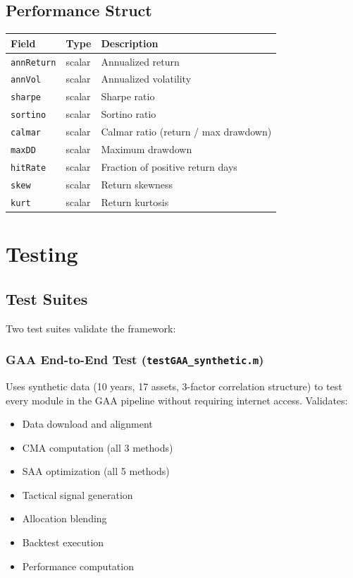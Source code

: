 \documentclass[11pt,a4paper]{article}
\begin{document}
\subsection{Performance Struct}
\begin{center}
\begin{tabularx}{\textwidth}{l l X}
\toprule
\textbf{Field} & \textbf{Type} & \textbf{Description} \\
\midrule
\texttt{annReturn} & scalar & Annualized return \\
\texttt{annVol} & scalar & Annualized volatility \\
\texttt{sharpe} & scalar & Sharpe ratio \\
\texttt{sortino} & scalar & Sortino ratio \\
\texttt{calmar} & scalar & Calmar ratio (return / max drawdown) \\
\texttt{maxDD} & scalar & Maximum drawdown \\
\texttt{hitRate} & scalar & Fraction of positive return days \\
\texttt{skew} & scalar & Return skewness \\
\texttt{kurt} & scalar & Return kurtosis \\
\bottomrule
\end{tabularx}
\end{center}
\newpage
\section{Testing}

\subsection{Test Suites}
Two test suites validate the framework:

\subsubsection{GAA End-to-End Test (\texttt{testGAA\_synthetic.m})}
Uses synthetic data (10 years, 17 assets, 3-factor correlation structure) to test every module in the GAA pipeline without requiring internet access. Validates:
\begin{itemize}[leftmargin=2em]
  \item Data download and alignment
  \item CMA computation (all 3 methods)
  \item SAA optimization (all 5 methods)
  \item Tactical signal generation
  \item Allocation blending
  \item Backtest execution
  \item Performance computation
\end{itemize}
\end{document}
